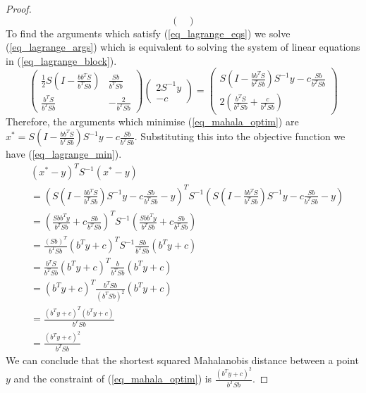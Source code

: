 \begin{proof}
\begin{equation}
\begin{pmatrix}
\end{pmatrix}
\label{eq_lagrance_block_inverse}
\end{equation}
To find the arguments which satisfy (\ref{eq_lagrange_eqs}) we solve (\ref{eq_lagrange_args}) which is equivalent to solving the system of linear equations in (\ref{eq_lagrange_block}).
\begin{equation}
\begin{pmatrix}
\frac{1}{2}S(I-\frac{bb^TS}{b^TSb}) & \frac{Sb}{b^TSb} \\ \frac{b^TS}{b^TSb} & -\frac{2}{b^TSb} \end{pmatrix} \begin{pmatrix}
2S^{-1}y \\ -c
\end{pmatrix} = \begin{pmatrix}
S(I-\frac{bb^TS}{b^TSb})S^{-1}y - c\frac{Sb}{b^TSb} \\
2(\frac{b^TS}{b^TSb} + \frac{c}{b^TSb})
\end{pmatrix}
\label{eq_lagrange_args}
\end{equation}
Therefore, the arguments which minimise (\ref{eq_mahala_optim}) are $x^* = S(I-\frac{bb^TS}{b^TSb})S^{-1}y - c\frac{Sb}{b^TSb}$. Substituting this into the objective function we have (\ref{eq_lagrange_min}).
\begin{equation}
\begin{aligned}
&\left(x^*-y\right)^TS^{-1}\left(x^*-y\right) \\ 
&= \left(S\left(I-\frac{bb^TS}{b^TSb}\right)S^{-1}y - c\frac{Sb}{b^TSb}-y\right)^TS^{-1}\left( S \left(I-\frac{bb^TS}{b^TSb}\right)S^{-1}y - c \frac{Sb}{b^TSb}-y\right) \\ 
&= \left(\frac{Sbb^Ty}{b^TSb} + c\frac{Sb}{b^TSb}\right)^TS^{-1}\left(\frac{Sbb^Ty}{b^TSb}+ c\frac{Sb}{b^TSb}\right) \\
&= \frac{(Sb)^T}{b^TSb}\left( b^Ty+c \right)^TS^{-1}\frac{Sb}{b^TSb}\left(b^Ty+c\right) \\
&= \frac{b^TS}{b^TSb}\left(b^Ty+c\right)^T\frac{b}{b^TSb}\left(b^Ty+c\right) \\
&= \left(b^Ty+c\right)^T\frac{b^TSb}{(b^TSb)^2}\left(b^Ty+c\right) \\
&= \frac{(b^Ty+c)^T(b^Ty+c)}{b^TSb} \\
&= \frac{(b^Ty+c)^2}{b^TSb}
\end{aligned}
\label{eq_lagrange_min}
\end{equation}
We can conclude that the shortest squared Mahalanobis distance between a point $y$ and the constraint of (\ref{eq_mahala_optim}) is $\frac{(b^Ty+c)^2}{b^TSb}$.
\end{proof}

